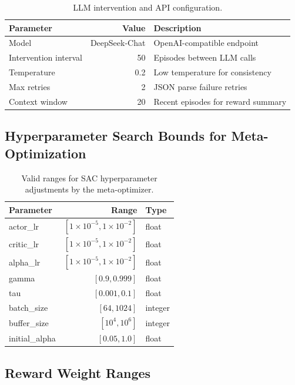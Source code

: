 \documentclass[11pt]{article}
\begin{document}
\begin{table}[h]
\centering
\caption{LLM intervention and API configuration.}
\begin{tabular}{lrl}
\toprule
\textbf{Parameter} & \textbf{Value} & \textbf{Description} \\
\midrule
Model & DeepSeek-Chat & OpenAI-compatible endpoint \\
Intervention interval & 50 & Episodes between LLM calls \\
Temperature & 0.2 & Low temperature for consistency \\
Max retries & 2 & JSON parse failure retries \\
Context window & 20 & Recent episodes for reward summary \\
\bottomrule
\end{tabular}
\end{table}

\subsection{Hyperparameter Search Bounds for Meta-Optimization}

\begin{table}[h]
\centering
\caption{Valid ranges for SAC hyperparameter adjustments by the meta-optimizer.}
\begin{tabular}{lrl}
\toprule
\textbf{Parameter} & \textbf{Range} & \textbf{Type} \\
\midrule
actor\_lr & $[1\times10^{-5}, 1\times10^{-2}]$ & float \\
critic\_lr & $[1\times10^{-5}, 1\times10^{-2}]$ & float \\
alpha\_lr & $[1\times10^{-5}, 1\times10^{-2}]$ & float \\
gamma & $[0.9, 0.999]$ & float \\
tau & $[0.001, 0.1]$ & float \\
batch\_size & $[64, 1024]$ & integer \\
buffer\_size & $[10^4, 10^6]$ & integer \\
initial\_alpha & $[0.05, 1.0]$ & float \\
\bottomrule
\end{tabular}
\end{table}

\subsection{Reward Weight Ranges}
\end{document}
